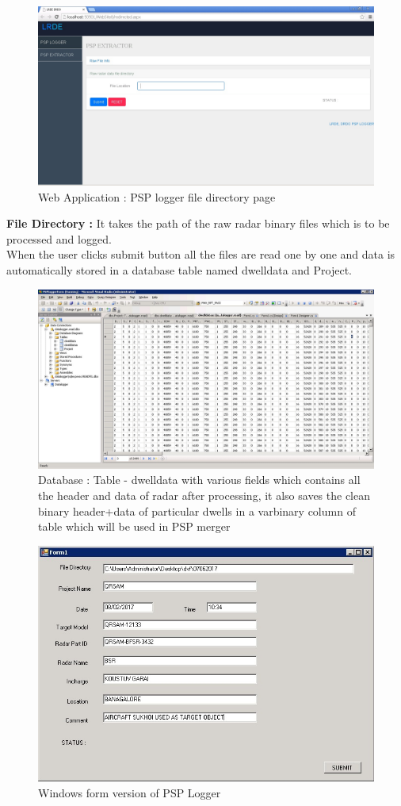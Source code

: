\documentclass[14pt]{article} %
\begin{document}
   \begin{figure}[H]
   \includegraphics[width=\linewidth]{DirectoryPage.jpg}
  \caption{Web Application : PSP logger file directory page}
  \label{fig:figure 23}
\end{figure}  
\indent \textbf{File Directory :} It takes the path of the raw radar binary files which is to \indent be processed and logged.\\
When the user clicks submit button all the files are read one by one and data is automatically stored in a database table named dwelldata and Project.
 \begin{figure}[H]
\includegraphics[width=\linewidth]{database_table_data2.jpg}
  \caption{Database : Table - dwelldata with various fields which contains all the header and data of radar after processing, it also saves the clean binary header+data of particular dwells in a varbinary column of table which will be used in PSP merger }
  \label{fig:figure 24}
\end{figure}  
   \begin{figure}[H]
    \centering
    \includegraphics[width=0.8\linewidth]{PSPloggerform.jpg}
  \caption{Windows form version of PSP Logger}
  \label{fig:figure 25}
\end{figure}  
\end{document}
